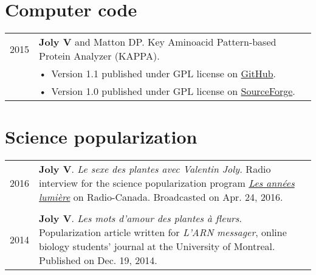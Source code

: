 \documentclass[letterpaper,12pt]{article}
\begin{document}
\vspace{6mm}

\section[Computer code]{Computer code}

\begin{tabularx}{\textwidth}{@{}r|X@{}}

2015
& \textbf{Joly V} and Matton DP. Key Aminoacid Pattern-based Protein Analyzer
  (KAPPA). \\
& \small \hspace{1.5mm} •~Version 1.1 published under GPL license on
  \href{https://github.com/valentinjoly/kappa-1.1}{GitHub}. \\
& \small \hspace{1.5mm} •~Version 1.0 published under GPL license on
  \href{https://sourceforge.net/projects/kappa-sequence-search/}{SourceForge}.
  \\

\end{tabularx}

\vspace{6mm}

\section[Science popularization]{Science popularization}

\begin{tabularx}{\textwidth}{@{}r|X@{}}

2016
& \textbf{Joly V}. {\em Le sexe des plantes avec Valentin Joly.} Radio
  interview for the science popularization program \href{http://ici.radio-canada.ca/emissions/les_annees_lumiere/2009-2010/chronique.asp?idChronique=404672}{\emph{Les années lumière}}
  on Radio-Canada. Broadcasted on Apr. 24, 2016. \\

\multicolumn{2}{c}{} \\

2014
& \textbf{Joly V}. {\em Les mots d’amour des plantes à fleurs}. Popularization
  article written for \emph{L'ARN messager}, online biology students' journal at
  the University of Montreal. Published on Dec. 19, 2014.
  \\

\end{tabularx}

\newpage
\end{document}
